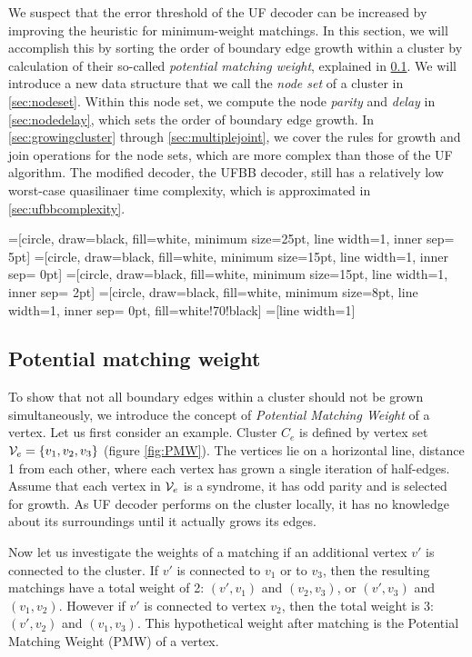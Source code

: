 We suspect that the error threshold of the UF decoder can be increased by improving the heuristic for minimum-weight matchings. In this section, we will accomplish this by sorting the order of boundary edge growth within a cluster by calculation of their so-called \emph{potential matching weight}, explained in \ref{sec:PMW}. We will introduce a new data structure that we call the \emph{node set} of a cluster in \ref{sec:nodeset}. Within this node set, we compute the node \emph{parity} and \emph{delay} in \ref{sec:nodedelay}, which sets the order of boundary edge growth. In \ref{sec:growingcluster} through \ref{sec:multiplejoint}, we cover the rules for growth and join operations for the node sets, which are more complex than those of the UF algorithm. The modified decoder, the UFBB decoder, still has a relatively low worst-case quasilinaer time complexity, which is approximated in \ref{sec:ufbbcomplexity}.


=[circle, draw=black, fill=white, minimum size=25pt, line width=1, inner sep= 5pt]
=[circle, draw=black, fill=white, minimum size=15pt, line width=1, inner sep= 0pt]
=[circle, draw=black, fill=white, minimum size=15pt, line width=1, inner sep= 2pt]
=[circle, draw=black, fill=white, minimum size=8pt, line width=1, inner sep= 0pt, fill=white!70!black]
=[line width=1]
\tikzfading[name=fade right, left color=transparent!0, right color=transparent!100]


\subsection{Potential matching weight}\label{sec:PMW}

To show that not all boundary edges within a cluster should not be grown simultaneously, we introduce the concept of \emph{Potential Matching Weight} of a vertex. Let us first consider an example. Cluster $C_e$ is defined by vertex set $\mathcal{V}_e = \{v_1, v_2, v_3\}$ (figure \ref{fig:PMW}). The vertices lie on a horizontal line, distance 1 from each other, where each vertex has grown a single iteration of half-edges. Assume that each vertex in $\mathcal{V}_e$ is a syndrome, it has odd parity and is selected for growth. As UF decoder performs on the cluster locally, it has no knowledge about its surroundings until it actually grows its edges.

Now let us investigate the weights of a matching if an additional vertex $v'$ is connected to the cluster.
If $v'$ is connected to $v_1$ or to $v_3$, then the resulting matchings have a total weight of 2: $(v',v_1)$ and $(v_2,v_3)$, or $(v',v_3)$ and $(v_1,v_2)$. However if $v'$ is connected to vertex $v_2$, then the total weight is 3: $(v', v_2)$ and $(v_1, v_3)$. This hypothetical weight after matching is the Potential Matching Weight (PMW) of a vertex.

